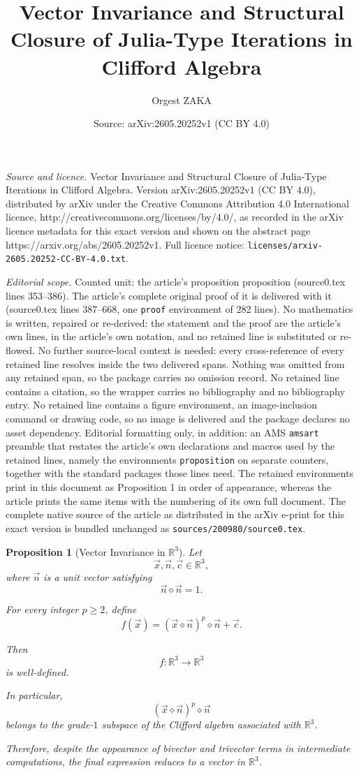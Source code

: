 \documentclass[10pt,a4paper]{amsart}
\title{Vector Invariance and Structural Closure of Julia-Type Iterations in Clifford Algebra}
\author{Orgest ZAKA}
\date{Source: arXiv:2605.20252v1 (CC BY 4.0)}
\newtheorem{proposition}{Proposition}
\begin{document}
\maketitle

\noindent\emph{Source and licence.} Vector Invariance and Structural Closure of Julia-Type Iterations in Clifford Algebra. Version arXiv:2605.20252v1 (CC BY 4.0), distributed by arXiv under the Creative Commons Attribution 4.0 International licence, http://creativecommons.org/licenses/by/4.0/, as recorded in the arXiv licence metadata for this exact version and shown on the abstract page https://arxiv.org/abs/2605.20252v1. Full licence notice: \texttt{licenses/arxiv-2605.20252-CC-BY-4.0.txt}.\par\smallskip

\noindent\textit{Editorial scope.} Counted unit: the article's proposition proposition (source0.tex lines 353--386). The article's complete original proof of it is delivered with it (source0.tex lines 387--668, one \texttt{proof} environment of 282 lines). No mathematics is written, repaired or re-derived: the statement and the proof are the article's own lines, in the article's own notation, and no retained line is substituted or re-flowed.  No further source-local context is needed: every cross-reference of every retained line resolves inside the two delivered spans.  Nothing was omitted from any retained span, so the package carries no omission record.  No retained line contains a citation, so the wrapper carries no bibliography and no bibliography entry.  No retained line contains a figure environment, an image-inclusion command or drawing code, so no image is delivered and the package declares no asset dependency.  Editorial formatting only, in addition: an AMS \texttt{amsart} preamble that restates the article's own declarations and macros used by the retained lines, namely the environments \texttt{proposition} on separate counters, together with the standard packages those lines need.  The retained environments print in this document as Proposition 1 in order of appearance, whereas the article prints the same items with the numbering of its own full document.  The complete native source of the article as distributed in the arXiv e-print for this exact version is bundled unchanged as \texttt{sources/200980/source0.tex}.
\begin{proposition}[Vector Invariance in $\mathbb{R}^{3}$]
Let
\[
\vec{x},\vec{n},\vec{c}\in \mathbb{R}^{3},
\]
where $\vec n$ is a unit vector satisfying
\[
\vec n\diamond \vec n =1.
\]

For every integer $p\ge 2$, define
\[
f(\vec{x})
=
(\vec{x}\diamond \vec n)^p\diamond \vec n+\vec c.
\]

Then
\[
f:\mathbb{R}^{3}\to \mathbb{R}^{3}
\]
is well-defined.

In particular,
\[
(\vec{x}\diamond \vec n)^p\diamond \vec n
\]
belongs to the grade-$1$ subspace of the Clifford algebra associated
with $\mathbb{R}^{3}$.

Therefore, despite the appearance of bivector and trivector terms in
intermediate computations, the final expression reduces to a vector in
$\mathbb{R}^{3}$.
\end{proposition}
\end{document}
